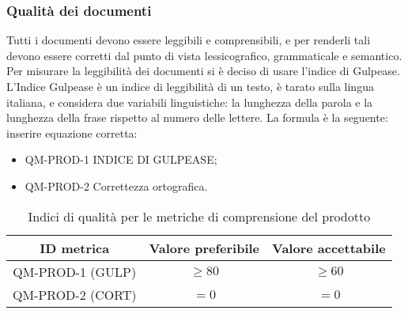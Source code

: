 \documentclass[../piano_di_qualifica.tex]{subfiles}
\begin{document}
\subsubsection{Qualità dei documenti}

Tutti i documenti devono essere leggibili e comprensibili, e per renderli tali devono essere corretti dal punto di vista lessicografico, grammaticale e semantico.
Per misurare la leggibilità dei documenti si è deciso di usare l’indice di Gulpease. L'Indice Gulpease è un indice di leggibilità di un testo, è tarato sulla lingua italiana, e considera due variabili linguistiche: la lunghezza della parola e la lunghezza della frase rispetto al numero delle lettere.
La formula è la seguente:  \\
inserire equazione corretta:\\


\begin{itemize}
\item QM-PROD-1 INDICE DI GULPEASE;
\item QM-PROD-2 Correttezza ortografica.
\end{itemize}


\begin{table}[!ht]
\centering
\begin{tabular}{|c|c|c|}
		\hline
		\rowcolor{lightgray}
		\textbf{ID metrica} & \textbf{Valore preferibile} & \textbf{Valore accettabile} \\
		\hline 
		QM-PROD-1 (GULP) & \(\ge 80\) & \(\ge 60\) \\
 		\hline
		QM-PROD-2 (CORT) & \(= 0\) & \(= 0\) \\
		\hline
\end{tabular}
\caption{Indici di qualità per le metriche di comprensione del prodotto}
\end{table}
\end{document}
